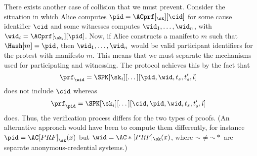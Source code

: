 There exists another case of collision that we must prevent.
Consider the situation in which Alice computes \(\pid = \ACprf[_\sk][\cid]\) for some cause identifier \(\cid\) and some witnesses computes \(\wid_1, \dotsc, \wid_n\), with \(\wid_i = \ACprf[_{\sk_i}][\pid]\).
Now, if Alice constructs a manifesto \(m\) such that \(\Hash[m] = \pid\), then \(\wid_1, \dotsc, \wid_n\) would be valid participant identifiers for the protest with manifesto \(m\).
This means that we must separate the mechanisms used for participating and witnessing.
The protocol achieves this by the fact that \[
  \prf_{\wid} = \SPK[\sk_i][\dotsc][\pid, \wid, t_s, t_s', l]
\]
does not include \(\cid\) whereas \[
  \prf_{\pid} = \SPK[\sk_i][\dotsc][\cid, \pid, \wid, t_s, t_s', l]
\]
does.
Thus, the verification process differs for the two types of proofs.
(An alternative approach would have been to compute them differently, for 
instance \(\pid = \AC[PRF]_{\sk}(x)\) but \(\wid = \AC*[PRF]_{\sk}(x)\), where 
\(\AC \neq \AC*\) are separate anonymous-credential systems.)

